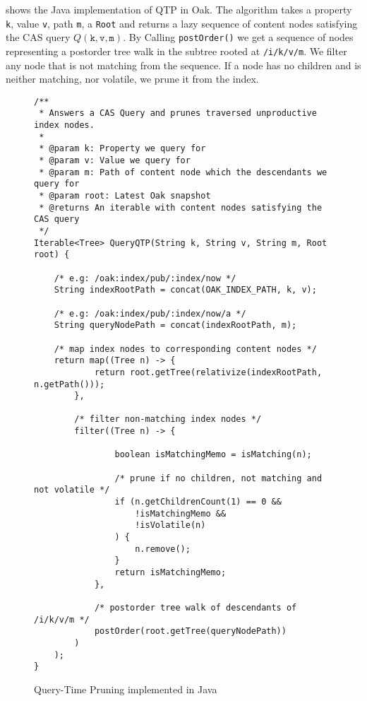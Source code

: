 \documentclass[abstracton,12pt]{scrartcl}
\theoremstyle{definition}
\begin{document}
 shows the Java implementation of QTP in Oak. The algorithm
takes a property \texttt{k}, value \texttt{v}, path \texttt{m}, a
\texttt{Root} and returns a lazy sequence of content nodes satisfying
the CAS query $Q(\texttt{k},\texttt{v},\texttt{m})$. By Calling
\texttt{postOrder()} we get a sequence of nodes representing a
postorder tree walk in the subtree rooted at \texttt{/i/k/v/m}. We filter any
node that is not
matching from the sequence. If a node has no children and is neither matching,
nor volatile, we prune it from the index.
\begin{figure}[H]
  \footnotesize
  \begin{framed}    
\begin{verbatim}
/**
 * Answers a CAS Query and prunes traversed unproductive index nodes.
 *
 * @param k: Property we query for
 * @param v: Value we query for
 * @param m: Path of content node which the descendants we query for
 * @param root: Latest Oak snapshot
 * @returns An iterable with content nodes satisfying the CAS query
 */
Iterable<Tree> QueryQTP(String k, String v, String m, Root root) {

    /* e.g: /oak:index/pub/:index/now */
    String indexRootPath = concat(OAK_INDEX_PATH, k, v); 

    /* e.g: /oak:index/pub/:index/now/a */
    String queryNodePath = concat(indexRootPath, m);

    /* map index nodes to corresponding content nodes */
    return map((Tree n) -> {
            return root.getTree(relativize(indexRootPath, n.getPath()));
        },

        /* filter non-matching index nodes */
        filter((Tree n) -> {
                
                boolean isMatchingMemo = isMatching(n);

                /* prune if no children, not matching and not volatile */
                if (n.getChildrenCount(1) == 0 &&
                    !isMatchingMemo &&
                    !isVolatile(n)
                ) {
                    n.remove();
                }
                return isMatchingMemo;
            },

            /* postorder tree walk of descendants of /i/k/v/m */
            postOrder(root.getTree(queryNodePath))
        )
    );
}
\end{verbatim}
  \end{framed}
  \caption[QTP implemented in Java]{Query-Time Pruning implemented in Java}
  \label{fig:java_qtp}
\end{figure}
\end{document}
